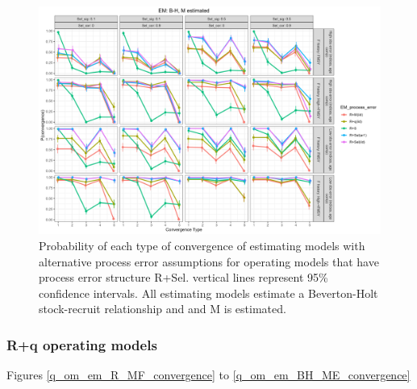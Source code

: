 \documentclass[
  12pt,
]{article}
\begin{document}
\begin{landscape}
\begin{figure}
\caption{Probability of each type of convergence of estimating models with alternative process error assumptions for operating models that have process error structure R+Sel. vertical lines represent 95\% confidence intervals. All estimating models estimate a Beverton-Holt stock-recruit relationship and and M is estimated.}\label{Sel_om_em_BH_ME_convergence}
\begin{center}
\includegraphics[width = \textwidth]{Sel_om_p_convergence_BH_M_estimated.png}
\end{center}
\end{figure}
\end{landscape}

\hypertarget{rq-operating-models}{%
\subsubsection*{R+q operating models}\label{rq-operating-models}}

Figures \ref{q_om_em_R_MF_convergence} to
\ref{q_om_em_BH_ME_convergence}
\end{document}
